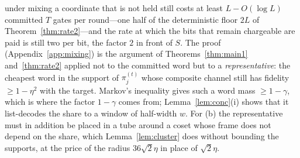 \documentclass[aps,prx,twocolumn,superscriptaddress,nofootinbib,longbibliography]{revtex4-2}
\theoremstyle{plain}
\theoremstyle{definition}
\theoremstyle{remark}
\begin{document}
under mixing a coordinate that is not held still costs at least $L-O(\log L)$ committed $T$ gates per round---one half of the deterministic floor $2L$ of Theorem~\ref{thm:rate2}---and the rate at which the bits that remain chargeable are paid is still two per bit, the factor $2$ in front of $S$. The proof (Appendix~\ref{app:mixing}) is the argument of Theorems~\ref{thm:main1} and~\ref{thm:rate2} applied not to the committed word but to a \emph{representative}: the cheapest word in the support of $\pi^{(t)}_j$ whose composite channel still has fidelity $\ge1-\eta^2$ with the target. Markov's inequality gives such a word mass $\ge1-\gamma$, which is where the factor $1-\gamma$ comes from; Lemma~\ref{lem:conc}(i) shows that it list-decodes the share to a window of half-width $w$. For (b) the representative must in addition be placed in a tube around a coset whose frame does not depend on the share, which Lemma~\ref{lem:cluster} does without bounding the supports, at the price of the radius $36\sqrt2\eta$ in place of $\sqrt2\eta$.
\end{document}
